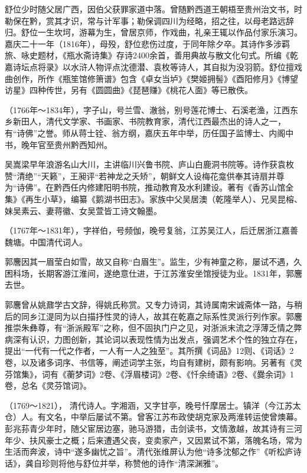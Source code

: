 \begin{description}
        舒位少时随父居广西，因伯父获罪家道中落。曾随黔西道王朝梧至贵州治文书，时勒保在黔，赏其才识，常与计军事；勒保调四川为经略，招之往，以母老路远辞归。舒位一生坎坷，游幕为生，曾居京师，作戏曲，礼亲王辄以作品付家乐演习。嘉庆二十一年（1816年），母殁，舒位悲伤过度，于同年除夕卒。其诗作多涉羁旅、咏史题材，《瓶水斋诗集》存诗2400余首，善用典故与散文化句式。所编《乾嘉诗坛点将录》以水浒人物评点沈德潜、袁枚等诗人，其自拟为没羽箭。舒位擅戏曲创作，所作《瓶笙馆修箫谱》包含《卓女当垆》《樊姬拥髻》《酉阳修月》《博望访星》四种传世，另有《圆圆曲》《琵琶赚》《桃花人面》等已散佚。
  \item[吴嵩梁] （1766年～1834年），字子山，号兰雪、澈翁，别号莲花博士、石溪老渔，江西东乡新田人，清代文学家、书画家、书院教育家，清代江西最杰出的诗人之一，有“诗佛”之誉。师从蒋士铨、翁方纲，嘉庆五年中举，历任国子监博士、内阁中书，晚年官至贵州黔西知州。\par
        吴嵩梁早年浪游名山大川，主讲临川兴鲁书院、庐山白鹿洞书院等。诗作获袁枚赞“清绝”“天籁”，王昶评“若神龙之夭矫”，朝鲜文人设梅花龛供奉其诗扇并尊为“诗佛”。在黔西任内修建阳明书院，推动教育及水利建设。著有《香苏山馆全集》《再生小草》，编纂《鹅湖书田志》。家族中父吴居澳（乾隆举人）、兄吴昆榕、妹吴素云、妻蒋徽、女吴萱皆工诗文翰墨。
  \item[郭麐] （1767年～1831年），字祥伯，号频伽，晚号复翁，江苏吴江人，后迁居浙江嘉善魏塘。中国清代词人。\par
        郭麐因其一眉莹白如雪，故又自称“白眉生”。监生，少有神童之称，屡试不遇，久困科场，长期客游江淮间，遂绝意仕进，于江苏淮安坐馆授徒为业。1831年，郭麐去世。\par
        郭麐曾从姚鼐学古文辞，得姚氏称赏。又专力诗词，其诗属南宋诚斋体一路，与稍后的同乡江湜同为以白描抒性灵的诗人，故其在乾嘉之际系性灵派行列作家。郭麐推崇朱彝尊，有“浙派殿军”之称，但不固执门户之见，对浙派末流之浮薄乏情之弊病深有认识，力图创新，其论词以表现性情为出发点，强调艺术个性的独立存在，提出“一代有一代之作者，一人有一人之独至”。其所撰《词品》12则、《词话》2卷，以及诸多词序、书信等，阐述词学主张，均自有建树，颇有影响。另著有《灵芬馆集》，词有《蘅梦词》2卷、《浮眉楼词》2卷、《忏余绮语》2卷、《爨余词》1卷，总名《灵芬馆词》。
  \item[彭兆荪] （1769～1821）， 清代诗人。字湘涵，又字甘亭，晚号忏摩居士。镇洋（今江苏太仓）人。有文名，中举后屡试不第。曾客江苏布政使胡克家及两淮转运使曾燠幕。彭兆荪青少年时，随父宦居边塞，驰马游猎，击剑读书，文情激越，故其诗有三河年少、扶风豪士之概；后来遭遇父丧，变卖家产，又因累试不第，落魄名场，常为生活而奔波，诗中“遂多幽忧之旨”。清代张维屏认为他“诗多沈郁之作”《听松庐诗话》，龚自珍则将他与舒位并举，称赞他的诗作“清深渊雅”。

\end{description}
